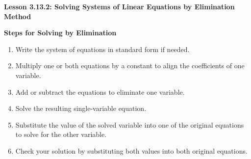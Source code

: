  \begin{center}
\textbf{Lesson 3.13.2: Solving Systems of Linear Equations by Elimination Method}
\end{center}

\vspace*{1ex}

\noindent\textbf{Steps for Solving by Elimination}

\begin{enumerate}[label = \arabic*. ]
    \item Write the system of equations in standard form if needed.
    \item Multiply one or both equations by a constant to align the coefficients of one variable.
    \item Add or subtract the equations to eliminate one variable.
    \item Solve the resulting single-variable equation.
    \item Substitute the value of the solved variable into one of the original equations to solve for the other variable.
    \item Check your solution by substituting both values into both original equations.
\end{enumerate}  


